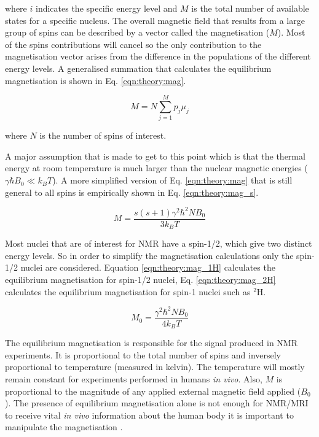 \noindent where $i$ indicates the specific energy level and $M$ is the total number of available states for a specific nucleus. The overall magnetic field that results from a large group of spins can be described by a vector called the magnetisation ($M$). Most of the spins contributions will cancel so the only contribution to the magnetisation vector arises from the difference in the populations of the different energy levels. A generalised summation that calculates the equilibrium magnetisation is shown in Eq. \ref{eqn:theory:mag}.

\begin{equation}
    M = N\sum_{j = 1}^{M}p_j\mu_j
    \label{eqn:theory:mag}
\end{equation}

\noindent where $N$ is the number of spins of interest. 

A major assumption that is made to get to this point which is that the thermal energy at room temperature is much larger than the nuclear magnetic energies ($\gamma \hbar B_0\ll k_BT$). A more simplified version of Eq. \ref{eqn:theory:mag} that is still general to all spins is empirically shown in Eq. \ref{eqn:theory:mag_s}.

\begin{equation}
    M = \frac{s(s+1)\gamma^2 \hbar^2 N B_0}{3k_BT}
    \label{eqn:theory:mag_s}
\end{equation}

\noindent Most nuclei that are of interest for \ac{NMR} have a spin-1/2, which give two distinct energy levels. So in order to simplify the magnetisation calculations only the spin-1/2 nuclei are considered. Equation \ref{eqn:theory:mag_1H} calculates the equilibrium magnetisation for spin-1/2 nuclei, Eq. \ref{eqn:theory:mag_2H} calculates the equilibrium magnetisation for spin-1 nuclei such as $^2$H.

\begin{equation}
    M_0 = \frac{\gamma^2 \hbar^2 N B_0}{4k_BT}
    \label{eqn:theory:mag_1H}
\end{equation}

The equilibrium magnetisation is responsible for the signal produced in \ac{NMR} experiments. It is proportional to the total number of spins and inversely proportional to temperature (measured in kelvin). The temperature will mostly remain constant for experiments performed in humans \textit{in vivo}. Also, $M$ is proportional to the magnitude of any applied external magnetic field applied ($B_0$). The presence of equilibrium magnetisation alone is not enough for \ac{NMR}/\ac{MRI} to receive vital \textit{in vivo} information about the human body it is important to manipulate the magnetisation \cite{Haacke2014MagneticDesign}. 


